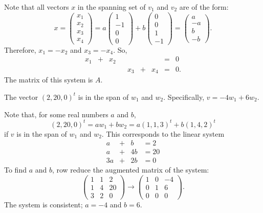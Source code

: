 \soln Note that all vectors $x$ in the spanning set of $v_1$ and $v_2$
are of the form:
\[
x = \left(\begin{array}{r} x_1 \\ x_2 \\ x_3 \\ x_4
\end{array}\right)
= a\left(\begin{array}{r} 1 \\ -1 \\ 0 \\ 0 \end{array}\right) + 
b\left(\begin{array}{r} 0 \\ 0 \\ 1 \\ -1 \end{array}\right) =
\left(\begin{array}{r} a \\ -a \\ b \\ -b \end{array}\right).
\]
Therefore, $x_1 = -x_2$ and $x_3 = -x_4$.  So,
\[
\begin{array}{rrrrrrrrl}
x_1 & + & x_2 & & & & & = & 0 \\
& & & & x_3 & + & x_4 & = & 0. \end{array}
\]
The matrix of this system is $A$.

\ans The vector $(2,20,0)^t$ is in the span of $w_1$ and $w_2$. 
Specifically, $v = -4w_1 + 6w_2$.

\soln Note that, for some real numbers $a$ and $b$,
\[
(2,20,0)^t = aw_1 + bw_2 = a(1,1,3)^t + b(1,4,2)^t
\]
if $v$ is in the span of $w_1$ and $w_2$.
This corresponds to the linear system
\[
\begin{array}{rrrrr}
a & + & b & = 2 \\
a & + & 4b & = 20 \\
3a & + & 2b & = 0 \end{array}
\]
To find $a$ and $b$, row reduce the augmented matrix of the system:
\[
\left(\begin{array}{rr|r} 1 & 1 & 2 \\ 1 & 4 & 20 \\
3 & 2 & 0 \end{array}\right) \longrightarrow
\left(\begin{array}{rr|r} 1 & 0 & -4 \\ 0 & 1 & 6 \\
0 & 0 & 0 \end{array}\right).
\]
The system is consistent; $a = -4$ and $b = 6$.

